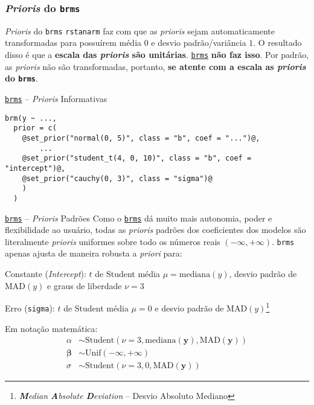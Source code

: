 \subsubsection{\textit{Prioris} do \texttt{brms}}
\begin{frame}{\textit{Prioris} do \texttt{brms}}
    \texttt{rstanarm} faz com que as \textit{prioris} sejam automaticamente
    transformadas para possuírem média $0$ e desvio padrão/variância $1$. O resultado
    disso é que a \textbf{escala das \textit{prioris} são unitárias}.
    \vfill
    \href{https://paul-buerkner.github.io/brms/}{\texttt{brms}} \textbf{não faz isso}.
    Por padrão, as \textit{prioris} não são transformadas, portanto, \textbf{se
    atente com a escala as \textit{prioris} do \texttt{brms}}.
\end{frame}

\begin{frame}[fragile]{\href{https://paul-buerkner.github.io/brms/}{\texttt{brms}} -- \textit{Prioris} Informativas}
    \begin{lstlisting}[basicstyle=\small]
brm(y ~ ...,
  prior = c(
    @set_prior("normal(0, 5)", class = "b", coef = "...")@,
        ...
    @set_prior("student_t(4, 0, 10)", class = "b", coef = "intercept")@,
    @set_prior("cauchy(0, 3)", class = "sigma")@
    )
  )
    \end{lstlisting}
\end{frame}

\begin{frame}{\href{https://paul-buerkner.github.io/brms/}{\texttt{brms}} -- \textit{Prioris} Padrões}
    Como o \href{https://paul-buerkner.github.io/brms/}{\texttt{brms}} dá
    muito mais autonomia, poder e flexibilidade ao usuário, todas as \textit{prioris}
    padrões dos coeficientes dos modelos são literalmente \textit{prioris} uniformes
    sobre todo os números reais $(-\infty, +\infty)$. \texttt{brms} apenas ajusta de
    maneira robusta a \textit{priori} para:
    \begin{vfilleditems}
        \item Constante (\textit{Intercept}): $t$ de Student média $\mu = \text{mediana}(y)$, desvio padrão de $\text{MAD}(y)$ e graus de liberdade $\nu = 3$
        \item Erro (\texttt{sigma}): $t$ de Student média $\mu = 0$ e desvio padrão de $\text{MAD}(y)$\footnote{\textit{\textbf{M}edian \textbf{A}bsolute \textbf{D}eviation} -- Desvio Absoluto Mediano}
    \end{vfilleditems}
Em notação matemática:
$$
\begin{aligned}
\alpha &\sim \text{Student}(\nu=3, \text{mediana}({\boldsymbol{y}}), \text{MAD}({\boldsymbol{y}}))\\
\boldsymbol{\beta} &\sim \text{Unif}(-\infty, + \infty) \\
\sigma &\sim \text{Student}(\nu=3, 0, \text{MAD}({\boldsymbol{y}}))
\end{aligned}
$$
\end{frame}
